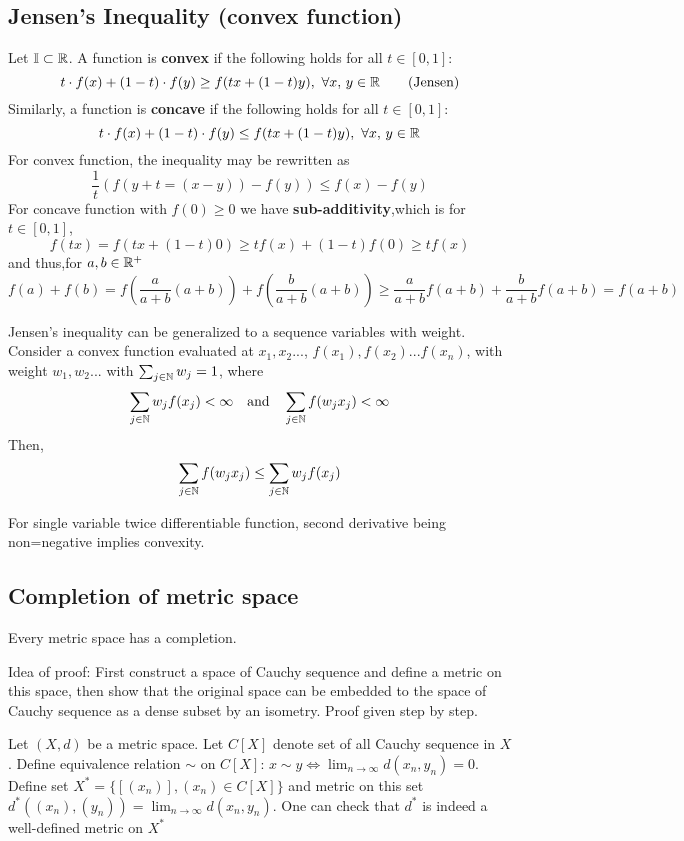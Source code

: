 \subsection{Jensen's Inequality (convex function)}\label{Jensen's inquality}
Let $\mathbb{I}\subset \mathbb{R}$. A function  is {\bf convex} if the following holds for all $t\in[0,1]$:
$$
	t\cdot f(x)+(1-t)\cdot f(y)\geq f(tx+(1-t)y),\,\,\forall x,\,y\in \mathbb{R}\quad\quad\text{(Jensen)}
$$
Similarly,  a function  is {\bf concave} if the following holds for all $t\in[0,1]$:
$$
	t\cdot f(x)+(1-t)\cdot f(y)\leq f(tx+(1-t)y),\,\,\forall x,\,y\in \mathbb{R}
$$
For convex function, the inequality may be rewritten as
$$
	\frac{1}{t}(f(y+t
	=(x-y))-f(y))\leq f(x)-f(y)
$$
For concave function with $f(0)\geq 0$ we have {\bf sub-additivity},which is for $t\in[0,1]$,
$$
	f(tx)=f(tx+(1-t)0)\geq tf(x)+(1-t)f(0)\geq tf(x)
$$
and thus,for $a,b\in\mathbb{R}^+$
$$
	f(a)+f(b)=f(\frac{a}{a+b}(a+b))+f(\frac{b}{a+b}(a+b))\geq \frac{a}{a+b}f(a+b)+\frac{b}{a+b}f(a+b)=f(a+b)
$$

\begin{remark}\rm\nextline
	Jensen's inequality can be generalized to a sequence variables with weight. Consider a convex function evaluated at $x_1,x_2...$, $f(x_1),f(x_2)...f(x_n)$, with weight $w_1,w_2...$ with $\sum_{j\in\mathbb{N}}w_j=1$, where
	$$
		\sum_{j\in\mathbb{N}}w_j f(x_j)<\infty \quad\text{and}\quad
		\sum_{j\in\mathbb{N}} f(w_jx_j)<\infty
	$$
	Then,
	$$
		\sum_{j\in\mathbb{N}} f(w_jx_j)\leq\sum_{j\in\mathbb{N}}w_j f(x_j)
	$$
\end{remark}

\begin{remark}[$f''>0$]\rm\nextline
	For single variable twice differentiable function, second derivative being non=negative implies convexity.
\end{remark}


\subsection{Completion of metric space}\label{completion of metric space}


\begin{theorem}\rm\nextline
	Every metric space has a completion.

\end{theorem}
Idea of proof: First construct a space of Cauchy sequence and define a metric on this space, then show that the original space can be embedded to the space of Cauchy sequence as a dense subset by an isometry. Proof given step by step.\\
\begin{lemma}\rm\nextline
	Let $(X,d)$ be a metric space. Let $C[X]$ denote set of all Cauchy sequence in $X$. Define equivalence relation $\sim$ on $C[X]$:
	$x\sim y\iff \lim_{n\to\infty}d(x_n,y_n)=0$. Define set $X^*=\{[(x_n)],(x_n)\in C[X]\}$ and metric on this set $d^*((x_n),(y_n))=\lim_{n\to\infty}d(x_n,y_n)$. One can check that $d^*$ is indeed a well-defined metric on $X^*$
\end{lemma}



